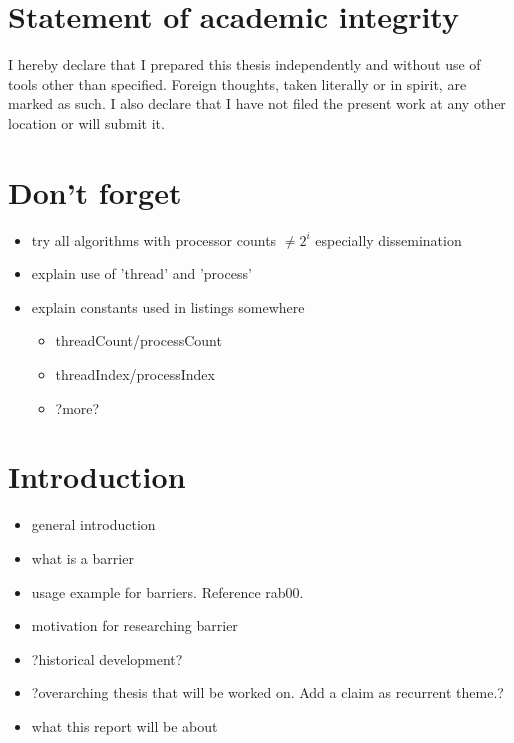 \documentclass[a4paper, 10pt]{article}
\begin{document}
\section*{Statement of academic integrity}
I hereby declare that I prepared this thesis independently and without use of tools other than specified. Foreign thoughts, taken literally or in spirit, are marked as such. I also declare that I have not filed the present work at any other location or will submit it.

\pagebreak
\newpage \thispagestyle{empty} \mbox{}
\pagebreak

\renewcommand{\contentsname}{Table of contents}
\tableofcontents

\pagebreak
\newpage \thispagestyle{empty} \mbox{}
\pagebreak

\section{Don't forget}
\begin{itemize}
	\item try all algorithms with processor counts $\neq 2^i$ especially dissemination
	\item explain use of 'thread' and 'process'
	\item explain constants used in listings somewhere
		\begin{itemize}
			\item threadCount/processCount
			\item threadIndex/processIndex
			\item ?more?
		\end{itemize}
\end{itemize}

\section{Introduction}
\begin{itemize}
	\item general introduction
	\item what is a barrier
	\item usage example for barriers. Reference rab00.
	\item motivation for researching barrier
	\item ?historical development?
	\item ?overarching thesis that will be worked on. Add a claim as recurrent theme.?
	\item what this report will be about
\end{itemize}
\end{document}
